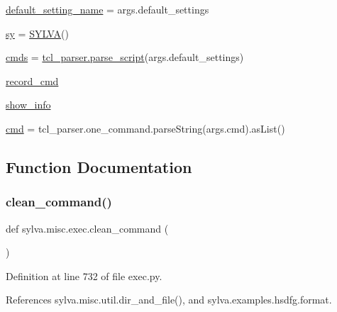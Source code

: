 \begin{DoxyCompactItemize}
\item 
\hyperlink{namespacesylva_1_1misc_1_1exec_a891749b8d985a498eae349a322db6717}{default\+\_\+setting\+\_\+name} = args.\+default\+\_\+settings
\item 
\hyperlink{namespacesylva_1_1misc_1_1exec_a7e1290d4d20b3d0e4d61c95571edda24}{sy} = \hyperlink{classsylva_1_1misc_1_1exec_1_1_s_y_l_v_a}{S\+Y\+L\+VA}()
\item 
\hyperlink{namespacesylva_1_1misc_1_1exec_a4c36666d7d4852a6684f769a8bc916f4}{cmds} = \hyperlink{namespacesylva_1_1misc_1_1tcl__parser_aab59812e931f24c8e7d1cbffd2fe587e}{tcl\+\_\+parser.\+parse\+\_\+script}(args.\+default\+\_\+settings)
\item 
\hyperlink{namespacesylva_1_1misc_1_1exec_a020e4ddb64c1ddaf08c5d43dc33b1a6f}{record\+\_\+cmd}
\item 
\hyperlink{namespacesylva_1_1misc_1_1exec_a887473109a0bd4665bac834e1a34eec0}{show\+\_\+info}
\item 
\hyperlink{namespacesylva_1_1misc_1_1exec_a49db5f46508c96872b9fd91c17271a25}{cmd} = tcl\+\_\+parser.\+one\+\_\+command.\+parse\+String(args.\+cmd).as\+List()
\end{DoxyCompactItemize}


\subsection{Function Documentation}
\mbox{\label{namespacesylva_1_1misc_1_1exec_a57af053cb45645bf285643c3a4f449f4}} 
\subsubsection{\texorpdfstring{clean\+\_\+command()}{clean\_command()}}
{\footnotesize\ttfamily def sylva.\+misc.\+exec.\+clean\+\_\+command (\begin{DoxyParamCaption}{ }\end{DoxyParamCaption})}



Definition at line 732 of file exec.\+py.



References sylva.\+misc.\+util.\+dir\+\_\+and\+\_\+file(), and sylva.\+examples.\+hsdfg.\+format.



